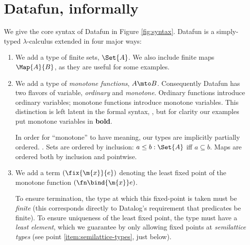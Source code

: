 \section{Datafun, informally}

We give the core syntax of Datafun in Figure \ref{fig:syntax}. Datafun is a
simply-typed $\lambda$-calculus extended in four major ways:

\begin{enumerate}
\item We add a type of finite sets, $\Set{A}$. We also include finite maps
  $\Map{A}{B}$, as they are useful for some examples.



\item We add a type of \emph{monotone functions}, $A \mto B$. Consequently
  Datafun has two flavors of variable, \emph{ordinary} and \emph{monotone}.
  Ordinary functions introduce ordinary variables; monotone functions introduce
  monotone variables. This distinction is left latent in the formal syntax,
  , but for clarity our examples put monotone variables in
  \textbf{bold}.

  In order for ``monotone'' to have meaning, our types are implicitly partially
  ordered. . Sets are ordered by inclusion: $a \le b :
  \Set{A}$ iff $a \subseteq b$. Maps are ordered both by inclusion and
  pointwise.

\item We add a term $(\fix{\m{x}}{e})$ denoting the least fixed point of the
  monotone function $(\fn\bind{\m{x}} e)$.


  To ensure termination, the type at which this fixed-point is taken must be
  \emph{finite} (this corresponds directly to Datalog's requirement that
  predicates be finite). To ensure uniqueness of the least fixed point, the type
  must have a \emph{least element}, which we guarantee by only allowing fixed
  points at \emph{semilattice types} (see point \ref{item:semilattice-types},
  just below).


\end{enumerate}
